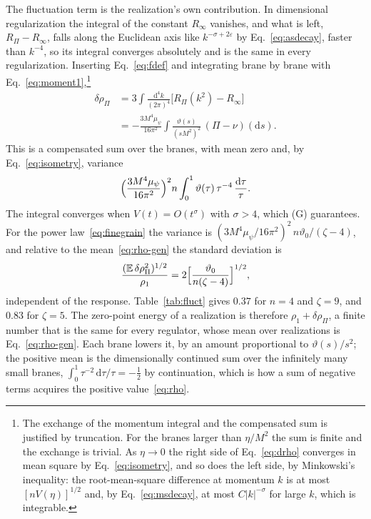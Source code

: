 \documentclass[aps,prd,10pt,twocolumn,superscriptaddress,nofootinbib,floatfix,longbibliography]{revtex4-2}
\newcommand{\bE}{\mathbb{E}}
\newcommand{\dd}{\mathrm{d}}
\begin{document}
The fluctuation term is the realization's own contribution. In dimensional regularization the integral of the constant $R_\infty$ vanishes, and what is left, $R_\Pi-R_\infty$, falls along the Euclidean axis like $k^{-\sigma+2\varepsilon}$ by Eq.~\eqref{eq:asdecay}, faster than $k^{-4}$, so its integral converges absolutely and is the same in every regularization. Inserting Eq.~\eqref{eq:fdef} and integrating brane by brane with Eq.~\eqref{eq:moment1},\footnote{The exchange of the momentum integral and the compensated sum is justified by truncation. For the branes larger than $\eta/M^2$ the sum is finite and the exchange is trivial. As $\eta\to0$ the right side of Eq.~\eqref{eq:drho} converges in mean square by Eq.~\eqref{eq:isometry}, and so does the left side, by Minkowski's inequality: the root-mean-square difference at momentum $k$ is at most $[nV(\eta)]^{1/2}$ and, by Eq.~\eqref{eq:msdecay}, at most $C|k|^{-\sigma}$ for large $k$, which is integrable.}
\begin{equation}
\label{eq:drho}
\begin{aligned}
\delta\rho_\Pi&=3\int\frac{\dd^4k}{(2\pi)^4}\bigl[R_\Pi(k^2)-R_\infty\bigr]\\
&=-\frac{3M^4\mu_\psi}{16\pi^2}\int\frac{\vartheta(s)}{(sM^2)^2}\,(\Pi-\nu)(\dd s).
\end{aligned}
\end{equation}
This is a compensated sum over the branes, with mean zero and, by Eq.~\eqref{eq:isometry}, variance
\[
\Bigl(\frac{3M^4\mu_\psi}{16\pi^2}\Bigr)^2n\int_0^1\vartheta(\tau)\,\tau^{-4}\,\frac{\dd\tau}{\tau} .
\]
The integral converges when $V(t)=O(t^\sigma)$ with $\sigma>4$, which (G) guarantees. For the power law~\eqref{eq:finegrain} the variance is $(3M^4\mu_\psi/16\pi^2)^2\,n\vartheta_0/(\zeta-4)$, and relative to the mean~\eqref{eq:rho-gen} the standard deviation is
\begin{equation}
\label{eq:drhorel}
\frac{(\bE\,\delta\rho_\Pi^2)^{1/2}}{\rho_1}=2\Bigl[\frac{\vartheta_0}{n(\zeta-4)}\Bigr]^{1/2},
\end{equation}
independent of the response. Table~\ref{tab:fluct} gives $0.37$ for $n=4$ and $\zeta=9$, and $0.83$ for $\zeta=5$. The zero-point energy of a realization is therefore $\rho_1+\delta\rho_\Pi$, a finite number that is the same for every regulator, whose mean over realizations is Eq.~\eqref{eq:rho-gen}. Each brane lowers it, by an amount proportional to $\vartheta(s)/s^2$; the positive mean is the dimensionally continued sum over the infinitely many small branes, $\int_0^1\tau^{-2}\,\dd\tau/\tau=-\frac12$ by continuation, which is how a sum of negative terms acquires the positive value~\eqref{eq:rho}.
\end{document}
